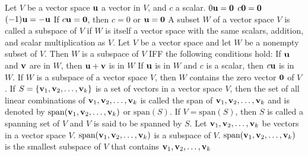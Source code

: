 \documentclass{article}
\begin{document}
        \begin{outline}
            \1 Let $V$ be a vector space \(\vb u\) a vector in $V$, and $c$ a scalar. 
                \2 \(0\vb u=\vb 0\)
                \2 \(c\vb 0=\vb 0\)
                \2 \((-1)\vb u=-\vb u\)
                \2 If \(c\vb u=\vb 0\), then \(c=0\) or \(\vb u=\vb 0\)
            \1 A subset $W$ of a vector space $V$ is called a subspace of $V$ if $W$ is itself a vector space with the same scalars, addition, and scalar multiplication as $V$. 
            \1 Let $V$ be a vector space and let $W$ be a nonempty subset of $V$. Then $W$ is a subspace of $V$ IFF the following conditions hold: 
                \2 If \(\vb u\) and \(\vb v\) are in $W$, then \(\vb u+\vb v\) is in \(W\)
                \2 If \(\vb u\) is in $W$ and $c$ is a scalar, then \(c\vb u\) is in $W$. 
            \1 If $W$ is a subspace of a vector space $V$, then $W$ contains the zero vector \(\vb 0\) of $V$. 
            \1 If \(S=\{\vb v_1,\vb v_2,\ldots,\vb v_k\}\) is a set of vectors in a vector space $V$, then the set of all linear combinations of \(\vb v_1,\vb v_2,\ldots,\vb v_k\) is called the span of \(\vb v_1,\vb v_2,\ldots,\vb v_k\) and is denoted by \(\text{span}(\vb v_1,\vb v_2,\ldots,\vb v_k)\) or \(\text{span}(S)\). If \(V=\text{span}(S)\), then $S$ is called a spanning set of $V$ and $V$ is said to be spanned by $S$. 
            \1 Let \(\vb v_1,\vb v_2,\ldots,\vb v_k\) be vectors in a vector space $V$. 
                \2 \(\text{span}(\vb v_1,\vb v_2,\ldots,\vb v_k)\) is a subspace of $V$. 
                \2 \(\text{span}(\vb v_1,\vb v_2,\ldots,\vb v_k)\) is the smallest subspace of $V$ that contains \(\vb v_1,\vb v_2,\ldots,\vb v_k\)

        \end{outline}
\end{document}
